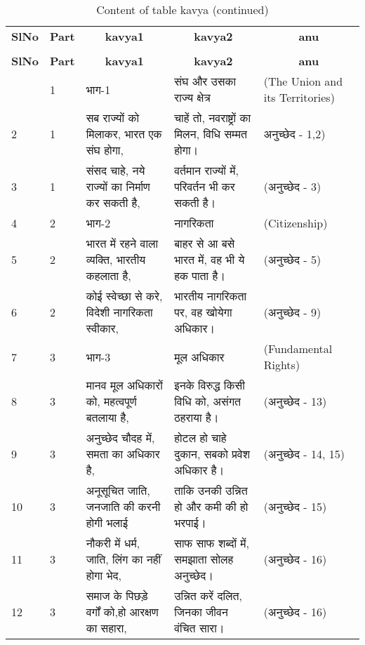 %
%
 \begin{longtable}{|l|l|l|l|l|} 
 \hline \endhead \hline \endfoot \hline 
 \caption{Content of table kavya} \label{tab:kavya-data} \\\hline \multicolumn{1}{|c|}{\textbf{SlNo}} & \multicolumn{1}{|c|}{\textbf{Part}} & \multicolumn{1}{|c|}{\textbf{kavya1}} & \multicolumn{1}{|c|}{\textbf{kavya2}} & \multicolumn{1}{|c|}{\textbf{anu}} \\ \hline \hline  \endfirsthead 
\caption{Content of table kavya (continued)} \\ \hline \multicolumn{1}{|c|}{\textbf{SlNo}} & \multicolumn{1}{|c|}{\textbf{Part}} & \multicolumn{1}{|c|}{\textbf{kavya1}} & \multicolumn{1}{|c|}{\textbf{kavya2}} & \multicolumn{1}{|c|}{\textbf{anu}} \\ \hline \hline \endhead \endfoot
1 & 1 & भाग-1 & संघ और उसका राज्य क्षेत्र & (The Union and its Territories) \\ \hline 
2 & 1 & सब राज्यों को मिलाकर, भारत एक संघ होगा, & चाहें तो, नवराष्ट्रों का मिलन, विधि सम्मत होगा। & अनुच्छेद - 1,2) \\ \hline 
3 & 1 & संसद चाहे, नये राज्यों का निर्माण कर सकती है, & वर्तमान राज्यों में, परिवर्तन भी कर सकती है। & (अनुच्छेद - 3) \\ \hline 
4 & 2 & भाग-2 & नागरिकता & (Citizenship) \\ \hline 
5 & 2 & भारत में रहने वाला व्यक्ति, भारतीय कहलाता है, & बाहर से आ बसे भारत में, वह भी ये हक पाता है। & (अनुच्छेद - 5) \\ \hline 
6 & 2 & कोई स्वेच्छा से करे, विदेशी नागरिकता स्वीकार, & भारतीय नागरिकता पर, वह खोयेगा अधिकार। & (अनुच्छेद - 9) \\ \hline 
7 & 3 & भाग-3 & मूल अधिकार  & (Fundamental Rights) \\ \hline 
8 & 3 & मानव मूल अधिकारों को, महत्वपूर्ण बतलाया है, & इनके विरुद्ध किसी विधि को, असंगत ठहराया है। & (अनुच्छेद - 13) \\ \hline 
9 & 3 & अनुच्छेद चौदह में, समता का अधिकार है, & होटल हो चाहे दुकान, सबको प्रवेश अधिकार है। & (अनुच्छेद - 14, 15) \\ \hline 
10 & 3 & अनूसूचित जाति, जनजाति की करनी होगी भलाई & ताकि उनकी उन्नित हो और कमी की हो भरपाई। & (अनुच्छेद - 15) \\ \hline 
11 & 3 & नौकरी में धर्म, जाति, लिंग का नहीं होगा भेद, & साफ साफ शब्दों में, समझाता सोलह अनुच्छेद। & (अनुच्छेद - 16) \\ \hline 
12 & 3 & समाज के पिछड़े वर्गों को,हो आरक्षण का सहारा, & उन्नित करें दलित, जिनका जीवन वंचित सारा। & (अनुच्छेद - 16) \\ \hline 

\end{longtable}
